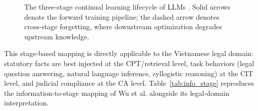 \begin{figure}[H]
\centering
{}
\caption{The three-stage continual learning lifecycle of LLMs \parencite{wu2024continuallearninglargelanguage}. Solid arrows denote the forward training pipeline; the dashed arrow denotes cross-stage forgetting, where downstream optimization degrades upstream knowledge.}
\label{fig:cl_lifecycle}
\end{figure}

This stage-based mapping is directly applicable to the Vietnamese legal domain: statutory facts are best injected at the CPT/retrieval level, task behaviors (legal question answering, natural language inference, syllogistic reasoning) at the CIT level, and judicial compliance at the CA level. Table~\ref{tab:info_stage} reproduces the information-to-stage mapping of Wu et al. \parencite{wu2024continuallearninglargelanguage} alongside its legal-domain interpretation.

